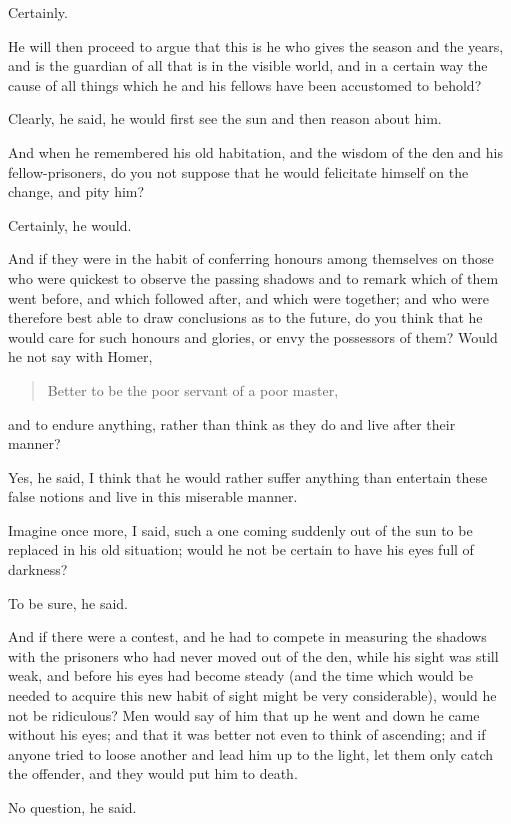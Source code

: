 Certainly.

He will then proceed to argue that this is he who gives the season and
the years, and is the guardian of all that is in the visible world,
and in a certain way the cause of all things which he and his fellows
have been accustomed to behold?

Clearly, he said, he would first see the sun and then reason about
him.

And when he remembered his old habitation, and the wisdom of the den
and his fellow-prisoners, do you not suppose that he would felicitate
himself on the change, and pity him?

Certainly, he would.

And if they were in the habit of conferring honours among themselves
on those who were quickest to observe the passing shadows and to
remark which of them went before, and which followed after, and which
were together; and who were therefore best able to draw conclusions as
to the future, do you think that he would care for such honours and
glories, or envy the possessors of them? Would he not say with Homer,

\begin{quote} Better to be the poor servant of a poor master,
\end{quote}

\noindent and to endure anything, rather than think as they do and
live after their manner?

Yes, he said, I think that he would rather suffer anything than
entertain these false notions and live in this miserable manner.

Imagine once more, I said, such a one coming suddenly out of the sun
to be replaced in his old situation; would he not be certain to have
his eyes full of darkness?

To be sure, he said.

And if there were a contest, and he had to compete in measuring the
shadows with the prisoners who had never moved out of the den, while
his sight was still weak, and before his eyes had become steady (and
the time which would be needed to acquire this new habit of sight
might be very considerable), would he not be ridiculous? Men would say
of him that up he went and down he came without his eyes; and that it
was better not even to think of ascending; and if anyone tried to
loose another and lead him up to the light, let them only catch the
offender, and they would put him to death.

No question, he said.

